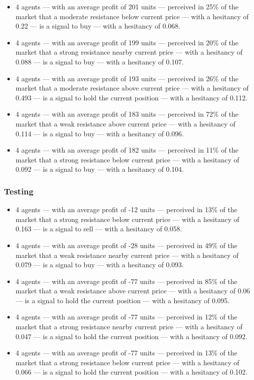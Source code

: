 {\scriptsize
  \begin{itemize}
  \item 4 agents — with an average profit of 201 units — perceived in 25\% of
    the market that a moderate resistance below current price — with a hesitancy
    of 0.22 — is a signal to buy — with a hesitancy of 0.068.
  \item 4 agents — with an average profit of 199 units — perceived in 20\% of
    the market that a strong resistance nearby current price — with a hesitancy
    of 0.088 — is a signal to buy — with a hesitancy of 0.107.
  \item 4 agents — with an average profit of 193 units — perceived in 26\% of
    the market that a moderate resistance above current price — with a hesitancy
    of 0.493 — is a signal to hold the current position — with a hesitancy of
    0.112.
  \item 4 agents — with an average profit of 183 units — perceived in 72\% of
    the market that a weak resistance above current price — with a hesitancy of
    0.114 — is a signal to buy — with a hesitancy of 0.096.
  \item 4 agents — with an average profit of 182 units — perceived in 11\% of
    the market that a strong resistance below current price — with a hesitancy
    of 0.092 — is a signal to buy — with a hesitancy of 0.104.
  \end{itemize}
}

\subsubsection{Testing}
\label{}

{\scriptsize
  \begin{itemize}
  \item 4 agents — with an average profit of -12 units — perceived in 13\% of
    the market that a strong resistance below current price — with a hesitancy
    of 0.163 — is a signal to sell — with a hesitancy of 0.058.
  \item 4 agents — with an average profit of -28 units — perceived in 49\% of
    the market that a weak resistance nearby current price — with a hesitancy of
    0.079 — is a signal to buy — with a hesitancy of 0.093.
  \item 4 agents — with an average profit of -77 units — perceived in 85\% of
    the market that a weak resistance above current price — with a hesitancy of
    0.06 — is a signal to hold the current position — with a hesitancy of 0.095.
  \item 4 agents — with an average profit of -77 units — perceived in 12\% of
    the market that a strong resistance nearby current price — with a hesitancy
    of 0.047 — is a signal to hold the current position — with a hesitancy of
    0.092.
  \item 4 agents — with an average profit of -77 units — perceived in 13\% of
    the market that a strong resistance below current price — with a hesitancy
    of 0.066 — is a signal to hold the current position — with a hesitancy of
    0.102.
  \end{itemize}
}




